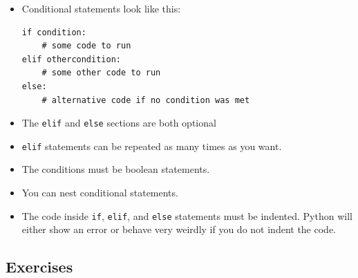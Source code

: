 \documentclass[11pt,hidelinks]{article}
\begin{document}
\begin{itemize}
  \item Conditional statements look like this:
    \begin{lstlisting}
if condition:
    # some code to run
elif othercondition:
    # some other code to run
else:
    # alternative code if no condition was met
    \end{lstlisting}

  \item The \lstinline!elif! and \lstinline!else! sections are both optional
  \item \lstinline!elif! statements can be repeated as many times as you want.
  \item The conditions must be boolean statements.
  \item You can nest conditional statements.
  \item The code inside \lstinline!if!, \lstinline!elif!, and \lstinline!else!
    statements must be indented. Python will either show an error or behave very
    weirdly if you do not indent the code.
\end{itemize}

\subsection{Exercises}
\label{subsec:ifex}
\end{document}

